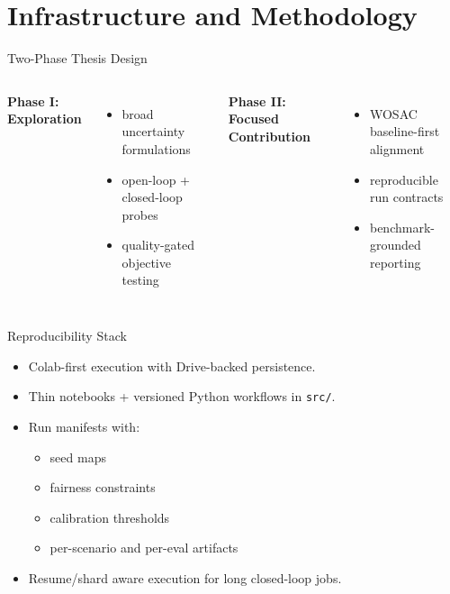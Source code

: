 \section{Infrastructure and Methodology}

\begin{frame}{Two-Phase Thesis Design}
\begin{columns}[T]
\textbf{Phase I: Exploration}
\begin{itemize}
    \item broad uncertainty formulations
    \item open-loop + closed-loop probes
    \item quality-gated objective testing
\end{itemize}

\textbf{Phase II: Focused Contribution}
\begin{itemize}
    \item WOSAC baseline-first alignment
    \item reproducible run contracts
    \item benchmark-grounded reporting
\end{itemize}
\end{columns}
\end{frame}

\begin{frame}{Reproducibility Stack}
\begin{itemize}
    \item Colab-first execution with Drive-backed persistence.
    \item Thin notebooks + versioned Python workflows in \texttt{src/}.
    \item Run manifests with:
    \begin{itemize}
        \item seed maps
        \item fairness constraints
        \item calibration thresholds
        \item per-scenario and per-eval artifacts
    \end{itemize}
    \item Resume/shard aware execution for long closed-loop jobs.
\end{itemize}
\end{frame}
